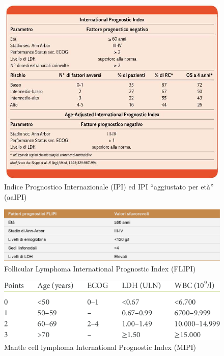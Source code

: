 \begin{figure}[H]
    \begin{center}
    \includegraphics[width=0.8\columnwidth]{img/IPI-AAIPI.jpeg}
    \vspace{-3mm}
    \end{center}
    \caption{Indice Prognostico Internazionale (IPI) ed IPI “aggiustato per età” (aaIPI)
    \cite{img15-18}}
    \label{fig:FIGURE_2.16}
\end{figure}

\begin{figure}[H]
    \begin{center}
    \includegraphics[width=0.8\columnwidth]{img/FLIPI.png}
    \vspace{-3mm}
    \end{center}
    \caption{Follicular Lymphoma International Prognostic Index (FLIPI)
    \cite{img19}}
    \label{fig:FIGURE_2.17}
\end{figure}

\begin{figure}[H]
    \begin{center}
    \includegraphics[width=0.6\columnwidth]{img/MIPI.png}
    \vspace{-3mm}
    \end{center}
    \caption{Mantle cell lymphoma International Prognostic Index (MIPI)
    \cite{MIPI}}
\label{fig:FIGURE_2.18}
\end{figure}

